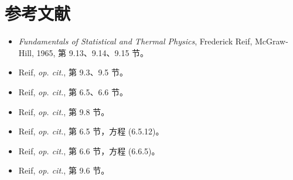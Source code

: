 \section{参考文献}

\begin{itemize}
  \item[{[1]}] \emph{Fundamentals of Statistical and Thermal Physics}, Frederick Reif, McGraw-Hill, 1965, 第 9.13、9.14、9.15 节。
  \item[{[2]}] Reif, \emph{op. cit.}, 第 9.3、9.5 节。
  \item[{[3]}] Reif, \emph{op. cit.}, 第 6.5、6.6 节。
  \item[{[4]}] Reif, \emph{op. cit.}, 第 9.8 节。
  \item[{[5]}] Reif, \emph{op. cit.}, 第 6.5 节，方程 (6.5.12)。
  \item[{[6]}] Reif, \emph{op. cit.}, 第 6.6 节，方程 (6.6.5)。
  \item[{[7]}] Reif, \emph{op. cit.}, 第 9.6 节。
\end{itemize}
